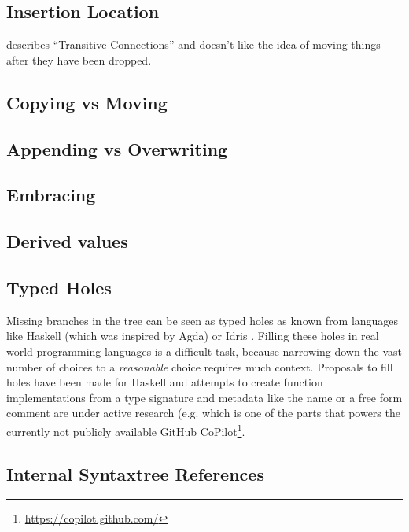 \subsection{Insertion Location}

\cite{fraser_ten_2015} describes \enquote{Transitive Connections} and doesn't like the idea of moving things after they have been dropped.

\subsection{Copying vs Moving}

\subsection{Appending vs Overwriting}

\subsection{Embracing}

\subsection{Derived values}

\subsection{Typed Holes}

Missing branches in the tree can be seen as typed holes as known from languages like Haskell (which was inspired by Agda) \cite{jones_haskell_2014} or Idris \cite{brady_type-driven_2017}. Filling these holes in real world programming languages is a difficult task, because narrowing down the vast number of choices to a \textit{reasonable} choice requires much context. Proposals to fill holes have been made for Haskell \cite{gissurarson_suggesting_2018} and attempts to create function implementations from a type signature and metadata like the name or a free form comment are under active research (e.g. \cite{chen_evaluating_2021} which is one of the parts that powers the currently not publicly available GitHub CoPilot\footnote{\url{https://copilot.github.com/}}.

\subsection{Internal Syntaxtree References}

